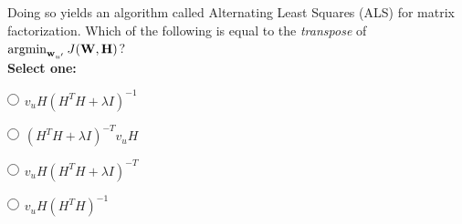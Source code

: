 \begin{enumerate}
     Doing so yields an algorithm called Alternating Least Squares (ALS) for matrix factorization. Which of the following is equal to the \emph{transpose} of $\mathop{\mathrm{argmin}}_{\mathbf{w}_{u'}} J(\mathbf{W}, \mathbf{H})$?\\
     \textbf{Select one:}

        \begin{list}{}
        \item $\circle$ $v_uH(H^TH+\lambda I)^{-1}$
        \item $\circle$ $(H^TH+\lambda I)^{-T}v_uH$
        \item $\circle$ $v_uH(H^TH+\lambda I)^{-T}$
        \item $\circle$ $v_uH(H^TH)^{-1}$
    \end{list}    
    
    
    \end{enumerate}
    